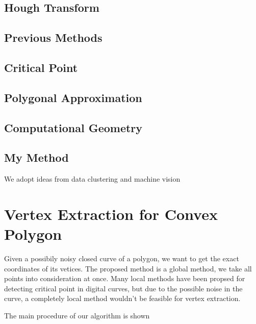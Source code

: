 \documentclass{article}
\begin{document}
\subsection{Hough Transform}
\label{sub:Hough Transform}

\subsection{Previous Methods}
\label{sub:Previous Methods}

\subsection{Critical Point}
\label{sub:Critical Point}

\subsection{Polygonal Approximation}
\label{sub:polygon}

\subsection{Computational Geometry}
\label{sub:Computational Geometry}

\subsection{My Method}
\label{sub:My Method}

We adopt ideas from data clustering and machine vision

\section{Vertex Extraction for Convex Polygon}
\label{sec:Vertex Extraction for Convex Polygon}
Given a possibily noisy closed curve of a polygon, we want to get the exact
coordinates of its vetices. The proposed method is a global method, we take
all points into consideration at once. Many local methods have been propsed
for detecting critical point in digital curves, but due to the possible noise in the curve,
a completely local method wouldn't be feasible for vertex extraction.

The main procedure of our algorithm is shown
\end{document}
